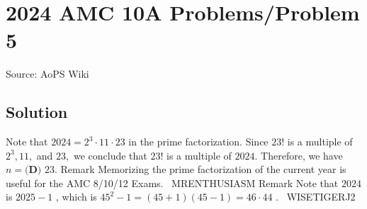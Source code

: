 \documentclass[12pt]{article}
\begin{document}
\section*{{2024 AMC 10A Problems/Problem 5}}
Source: AoPS Wiki

\subsection*{Solution}
Note that $2024=2^3\cdot11\cdot23$ in the prime factorization. Since $23!$ is a multiple of $2^3, 11,$ and $23,$ we conclude that $23!$ is a multiple of $2024.$ Therefore, we have $n=\boxed{\textbf{(D) } 23}.$ Remark Memorizing the prime factorization of the current year is useful for the AMC 8/10/12 Exams. ~MRENTHUSIASM Remark Note that $2024$ is $2025 -1$ , which is $45^2 -1 = (45+1)(45-1) = 46\cdot44$ . ~WISETIGERJ2
\end{document}
